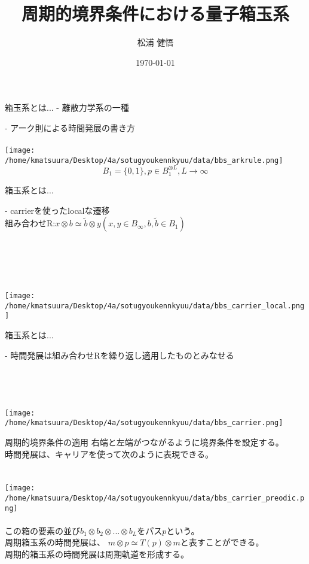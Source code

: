 \documentclass[aspectratio=169, dvipdfmx, 11pt]{beamer} %
\title[Quantinization of Preodic Box Ball System]{周期的境界条件における量子箱玉系}
\author[k.matsuura]{松浦 健悟}
\institute[]{東京大学教養学部統合自然科学科物質基礎科学コース}
\date{\today}
\begin{document}
\maketitle


\begin{frame}{箱玉系とは...}
- 離散力学系の一種

- アーク則による時間発展の書き方
\leavevmode\\~\\
\texttt{[image: /home/kmatsuura/Desktop/4a/sotugyoukennkyuu/data/bbs\_arkrule.png]}
$$B_1 = \{0, 1\}, p \in B_1 ^ {\otimes L}, L \rightarrow \infty$$


\end{frame}

\begin{frame}{箱玉系とは...}

- carrierを使ったlocalな遷移\\
組み合わせR:$x \otimes b  \simeq \tilde{b} \otimes y(x,y \in B_\infty, b,\tilde{b} \in B_1)$
\leavevmode\\~\\
\leavevmode\\~\\
\leavevmode\\~\\
\texttt{[image: /home/kmatsuura/Desktop/4a/sotugyoukennkyuu/data/bbs\_carrier\_local.png]}

\end{frame}

\begin{frame}{箱玉系とは...}

- 時間発展は組み合わせRを繰り返し適用したものとみなせる\\
\leavevmode\\~\\
\leavevmode\\~\\
\texttt{[image: /home/kmatsuura/Desktop/4a/sotugyoukennkyuu/data/bbs\_carrier.png]}
\end{frame}

\begin{frame}{周期的境界条件の適用}
右端と左端がつながるように境界条件を設定する。\\
時間発展は、キャリアを使って次のように表現できる。\\
\leavevmode\\~\\
\texttt{[image: /home/kmatsuura/Desktop/4a/sotugyoukennkyuu/data/bbs\_carrier\_preodic.png]}
\leavevmode\\~\\
この箱の要素の並び$b_1 \otimes b_2 \otimes ... \otimes b_L$をパス$p$という。\\
周期箱玉系の時間発展は、 $m \otimes p \simeq T(p) \otimes m $と表すことができる。\\
周期的箱玉系の時間発展は周期軌道を形成する。

\end{frame}
\end{document}
